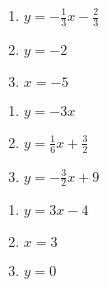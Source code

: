 \begin{multicols}{3}
\begin{enumerate}
\setcounter{enumi}{\value{HW}}

\item $y = -\frac{1}{3} x - \frac{2}{3}$
\item $y=-2$
\item $x=-5$


\setcounter{HW}{\value{enumi}}
\end{enumerate}
\end{multicols}


\begin{multicols}{3}
\begin{enumerate}
\setcounter{enumi}{\value{HW}}

\item $y = -3x$
\item $y = \frac{1}{6}x + \frac{3}{2}$
\item $y = -\frac{3}{2} x +9$



\setcounter{HW}{\value{enumi}}
\end{enumerate}
\end{multicols}

\begin{multicols}{3}
\begin{enumerate}
\setcounter{enumi}{\value{HW}}

\item $y = 3x-4$
\item $x=3$
\item $y=0$


\setcounter{HW}{\value{enumi}}
\end{enumerate}
\end{multicols}



\closegraphsfile